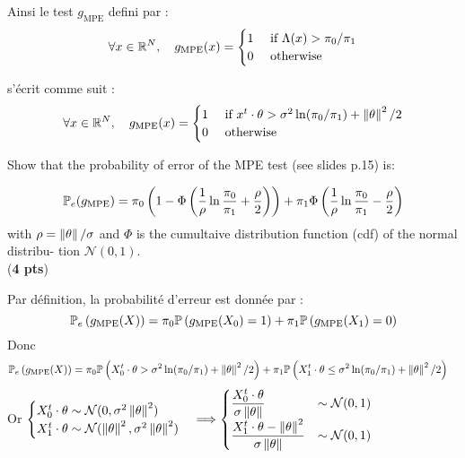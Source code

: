 \documentclass[12pt,a4paper]{article}
\begin{document}
 Ainsi le test $g_\text{MPE}$ defini par : 
 $$  \forall x \in \mathbb{R}^N,\quad g_\text{MPE}(x) = \begin{cases}
    1 &\text{ if } \Lambda(x) > \pi_0/\pi_1  \\
    0 & \text{ otherwise } \end{cases} $$

s'écrit comme suit :
$$ \forall x \in \mathbb{R}^N,\quad g_\text{MPE}(x) = \begin{cases}
    1 &\text{ if } x^t\cdot\theta >\sigma^2\ln(\pi_0/\pi_1) + \left\|{\theta}\right\|^2/2 \\
    0 & \text{ otherwise } 
\end{cases} $$


\begin{tquesto}{}{}
Show that the probability of error of the MPE test (see slides p.15) is:

$$ \mathbb{P}_e (g_\text{MPE}) =   \pi_0 \left( 1-\Phi \left( \dfrac{1}{\rho}\ln\dfrac{\pi_0}{\pi_1} + \dfrac{\rho}{2}\right) \right) +\pi_1 \Phi \left( \dfrac{1}{\rho}\ln\dfrac{\pi_0}{\pi_1} - \dfrac{\rho}{2}\right) $$
with $\rho = \left\|{\theta}\right\|/\sigma$ and $\Phi$ is the cumultaive distribution function (cdf) of the normal distribu-
tion $\mathcal{N}(0,1)$.\\
(\textbf{4 pts})
\end{tquesto}
Par définition, la probabilité d'erreur est donnée par : 
$$
    \mathbb{P}_e\left(g_\text{MPE}(X)\right)  = \pi_0 \mathbb{P}\left(g_\text{MPE}(X_0) = 1 \right) + \pi_1 \mathbb{P}\left(g_\text{MPE}(X_1) = 0 \right) $$
Donc 
\begin{align*}
    \mathbb{P}_e\left(g_\text{MPE}(X)\right) & =
    \pi_0 \mathbb{P}\left(X_0^t\cdot\theta >\sigma^2\ln(\pi_0/\pi_1) + \left\|{\theta}\right\|^2/2 \right) + \pi_1 \mathbb{P}\left(X_1^t\cdot\theta 
\leq \sigma^2\ln(\pi_0/\pi_1) + \left\|{\theta}\right\|^2/2 \right) 
\end{align*}
Or $\begin{cases}
    X_0^t\cdot\theta \sim \mathcal{N}(0,\sigma^2\left\|{\theta}\right\|^2) \\
    X_1^t\cdot\theta \sim \mathcal{N}(\left\|{\theta}\right\|^2,\sigma^2\left\|{\theta}\right\|^2)
\end{cases} \Longrightarrow \begin{cases}
    \dfrac{X_0^t\cdot\theta}{\sigma\left\|{\theta}\right\|}  &\sim \mathcal{N}(0,1) \\
    \dfrac{X_1^t\cdot\theta- \left\|{\theta}\right\|^2}{\sigma\left\|{\theta}\right\|} &\sim \mathcal{N}(0,1)
\end{cases}$\\
\end{document}

